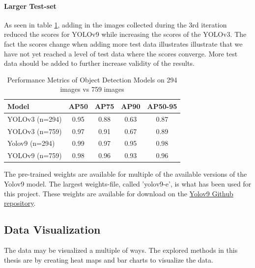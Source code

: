 \paragraph{Larger Test-set}
\label{sec:larger_test_set}
As seen in table \ref{tab:larger_test_set}, adding in the images collected during the 3rd iteration reduced the scores for YOLOv9 while increasing the scores of the YOLOv3. The fact the scores change when adding more test data illustrates illustrate that we have not yet reached a level of test data where the scores converge. More test data should be added to further increase validity of the results.

\begin{table}[H]
    \centering
    \renewcommand{\arraystretch}{1.5} %
    \setlength{\tabcolsep}{1em}
    \begin{tabular}{|l|c|c|c|c|}
        \hline
        \rowcolor{gray!25}
        \textbf{Model} & \textbf{AP50} & \textbf{AP75} & \textbf{AP90} & \textbf{AP50-95} \\ \hline
		YOLOv3 (n=294) & 0.95 & 0.88 & 0.63 & 0.87 \\ \hline
		YOLOv3 (n=759) & 0.97 & 0.91 & 0.67 & 0.89 \\ \hline
		Yolov9 (n=294) & 0.99 & 0.97 & 0.95 & 0.98 \\ \hline
		YOLOv9 (n=759) & 0.98 & 0.96 & 0.93 & 0.96 \\ \hline
    \end{tabular}
    \caption{\centering Performance Metrics of Object Detection Models on 294 images vs 759 images}
    \label{tab:larger_test_set}
\end{table}

The pre-trained weights are available for multiple of the available versions of the Yolov9 model. The largest weights-file, called 'yolov9-e', is what has been used for this project. These weights are available for download on the \href{https://github.com/WongKinYiu/yolov9}{Yolov9 Github repository}.

\subsection{Data Visualization}
The data may be visualized a multiple of ways. The explored methods in this thesis are by creating heat maps and bar charts to visualize the data. 

